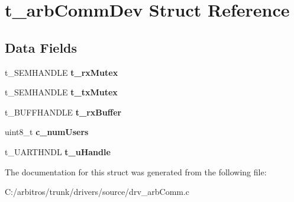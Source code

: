\hypertarget{structt__arb_comm_dev}{\section{t\-\_\-arb\-Comm\-Dev Struct Reference}
\label{structt__arb_comm_dev}
}
\subsection*{Data Fields}
\begin{DoxyCompactItemize}
\item 
\hypertarget{structt__arb_comm_dev_a6c668c5c6ef7ecd4aa0eeca1dc3352cf}{t\-\_\-\-S\-E\-M\-H\-A\-N\-D\-L\-E {\bfseries t\-\_\-rx\-Mutex}}\label{structt__arb_comm_dev_a6c668c5c6ef7ecd4aa0eeca1dc3352cf}

\item 
\hypertarget{structt__arb_comm_dev_a17abeacecc1a41425fc9fd04a89e026e}{t\-\_\-\-S\-E\-M\-H\-A\-N\-D\-L\-E {\bfseries t\-\_\-tx\-Mutex}}\label{structt__arb_comm_dev_a17abeacecc1a41425fc9fd04a89e026e}

\item 
\hypertarget{structt__arb_comm_dev_abfbc70e94616edab7b4177058a7f188d}{t\-\_\-\-B\-U\-F\-F\-H\-A\-N\-D\-L\-E {\bfseries t\-\_\-rx\-Buffer}}\label{structt__arb_comm_dev_abfbc70e94616edab7b4177058a7f188d}

\item 
\hypertarget{structt__arb_comm_dev_a65907c8d88006e5cdc5e6b18eb4606ba}{uint8\-\_\-t {\bfseries c\-\_\-num\-Users}}\label{structt__arb_comm_dev_a65907c8d88006e5cdc5e6b18eb4606ba}

\item 
\hypertarget{structt__arb_comm_dev_adff9fcc9b301fd4d7521fb37d7490034}{t\-\_\-\-U\-A\-R\-T\-H\-N\-D\-L {\bfseries t\-\_\-u\-Handle}}\label{structt__arb_comm_dev_adff9fcc9b301fd4d7521fb37d7490034}

\end{DoxyCompactItemize}


The documentation for this struct was generated from the following file\-:\begin{DoxyCompactItemize}
\item 
C\-:/arbitros/trunk/drivers/source/drv\-\_\-arb\-Comm.\-c\end{DoxyCompactItemize}
